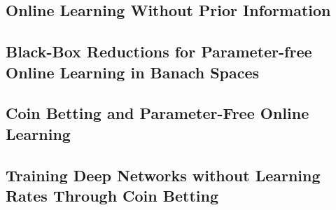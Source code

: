 \subsection{Online Learning Without Prior Information}
\label{ssec: online_learning_without_prior_info}


\subsection{Black-Box Reductions for Parameter-free Online Learning in Banach Spaces}


\subsection{Coin Betting and Parameter-Free Online Learning}


\subsection{Training Deep Networks without Learning Rates Through Coin Betting}


